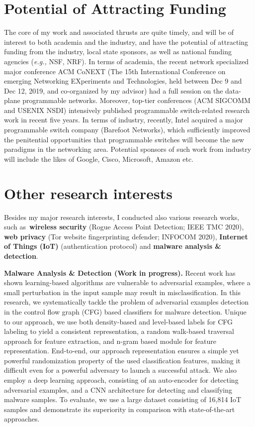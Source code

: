 \documentclass{NSF}
\newcommand{\BfPara}[1]{{\noindent\textbf{#1.}}\xspace}
\newcommand{\etc}{{etc.}\xspace}
\newcommand{\eg}{{\em e.g.,}\xspace}
\begin{document}
\section{Potential of Attracting Funding}\vspace{-1mm}
The core of my work and associated thrusts are quite timely, and will be of interest to both academia and the industry, and have the potential of attracting funding from the industry, local state sponsors, as well as national funding agencies (\eg NSF, NRF). In terms of academia, the recent network specialized major conference ACM CoNEXT (The 15th International Conference on emerging Networking EXperiments and Technologies, held between Dec 9 and Dec 12, 2019, and co-organized by my advisor) had a full session on the data-plane programmable networks. Moreover, top-tier conferences (ACM SIGCOMM and USENIX NSDI) intensively published programmable switch-related research work in recent five years. In terms of industry, recently, Intel acquired a major programmable switch company (Barefoot Networks), which sufficiently improved the penitential opportunities that programmable switches will become the new paradigms in the networking area. Potential sponsors of such work from industry will include the likes of Google, Cisco, Microsoft, Amazon \etc  


\section{Other research interests} \vspace{-1mm}
Besides my major research interests, I conducted also various research works, such as~\textbf{wireless security} (Rogue Access Point Detection; IEEE TMC 2020), \textbf{web privacy} (Tor website fingerprinting defender; INFOCOM 2020), \textbf{Internet of Things (IoT)} (authentication protocol)  and \textbf{malware analysis \& detection}. %

\BfPara{Malware Analysis \& Detection (Work in progress)} Recent work has shown learning-based algorithms are vulnerable to adversarial examples, where a small perturbation in the input sample may result in misclassification. In this research, we systematically tackle the problem of adversarial examples detection in the control flow graph (CFG) based classifiers for malware detection. Unique to our approach, we use both density-based and level-based labels for CFG labeling to yield a consistent representation, a random walk-based traversal approach for feature extraction, and n-gram based module for feature representation. End-to-end, our approach representation ensures a simple yet powerful randomization property of the used classification features, making it difficult even for a powerful adversary to launch a successful attack. We also employ a deep learning approach, consisting of an auto-encoder for detecting adversarial examples, and a CNN architecture for detecting and classifying malware samples. To evaluate, we use a large dataset consisting of 16,814 IoT samples and demonstrate its superiority in comparison with state-of-the-art approaches. 
\end{document}
